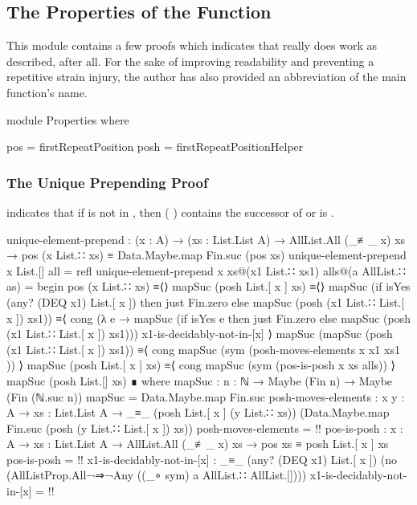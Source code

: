 \documentclass{report}
\begin{document}
\subsection{The Properties of the Function}
This module contains a few proofs which indicates that  really does work as described, after all.  For the sake of improving readability and preventing a repetitive strain injury, the author has also provided an abbreviation of the main function's name.

\begin{code}
  module Properties where

    pos = firstRepeatPosition
    posh = firstRepeatPositionHelper
\end{code}

\subsubsection{The Unique Prepending Proof}
 indicates that if  is not in , then  \AgdaSymbol(  \AgdaSymbol) contains the successor of   or is .

\begin{code}
    unique-element-prepend :
      (x : A) →
      (xs : List.List A) →
      AllList.All (_≢_ x) xs →
      pos (x List.∷ xs) ≡ Data.Maybe.map Fin.suc (pos xs)
    unique-element-prepend x List.[] all = refl
    unique-element-prepend x xs@(x1 List.∷ xs1) alls@(a AllList.∷ as) = begin
      pos (x List.∷ xs)
        ≡⟨⟩
      mapSuc (posh List.[ x ] xs)
        ≡⟨⟩
      mapSuc (if isYes (any? (DEQ x1) List.[ x ])
                 then just Fin.zero
                 else mapSuc (posh (x1 List.∷ List.[ x ]) xs1))
        ≡⟨ cong (λ e → mapSuc (if isYes e
                                   then just Fin.zero
                                   else mapSuc (posh (x1 List.∷ List.[ x ]) xs1)))
                x1-is-decidably-not-in-[x] ⟩
      mapSuc (mapSuc (posh (x1 List.∷ List.[ x ]) xs1))
        ≡⟨ cong mapSuc (sym (posh-moves-elements {x} {x1} {xs1} )) ⟩
      mapSuc (posh List.[ x ] xs)
        ≡⟨ cong mapSuc (sym (pos-is-posh {x} {xs} alls)) ⟩
      mapSuc (posh List.[] xs) ∎
      where
      mapSuc : {n : ℕ} → Maybe (Fin n) → Maybe (Fin (ℕ.suc n))
      mapSuc = Data.Maybe.map Fin.suc
      posh-moves-elements :
        {x y : A} →
        {xs : List.List A} →
        _≡_ (posh List.[ x ] (y List.∷ xs))
            (Data.Maybe.map Fin.suc (posh (y List.∷ List.[ x ]) xs))
      posh-moves-elements = {!!}
      pos-is-posh :
        {x : A} →
        {xs : List.List A} →
        AllList.All (_≢_ x) xs →
        pos xs ≡ posh List.[ x ] xs
      pos-is-posh = {!!}
      x1-is-decidably-not-in-[x] :
        _≡_ (any? (DEQ x1) List.[ x ])
            (no (AllListProp.All¬⇒¬Any ((_∘ sym) a AllList.∷ AllList.[])))
      x1-is-decidably-not-in-[x] = {!!}
\end{code}
\end{document}
